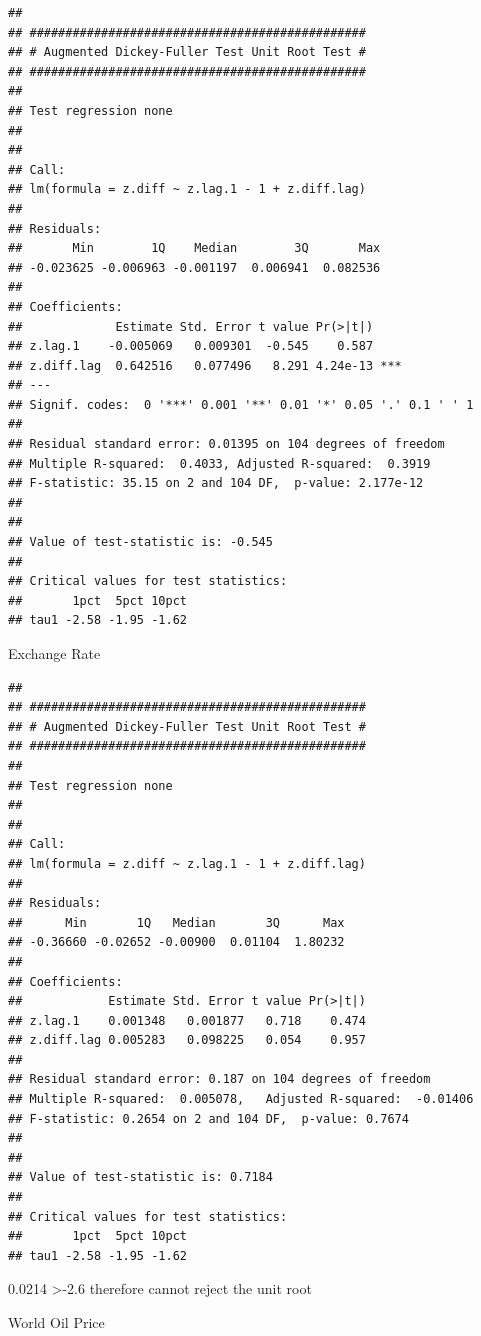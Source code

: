 \documentclass[11pt,preprint, authoryear]{elsarticle}
\numberwithin{equation}{section}
\numberwithin{figure}{section}
\numberwithin{table}{section}
\begin{document}
\begin{verbatim}
## 
## ############################################### 
## # Augmented Dickey-Fuller Test Unit Root Test # 
## ############################################### 
## 
## Test regression none 
## 
## 
## Call:
## lm(formula = z.diff ~ z.lag.1 - 1 + z.diff.lag)
## 
## Residuals:
##       Min        1Q    Median        3Q       Max 
## -0.023625 -0.006963 -0.001197  0.006941  0.082536 
## 
## Coefficients:
##             Estimate Std. Error t value Pr(>|t|)    
## z.lag.1    -0.005069   0.009301  -0.545    0.587    
## z.diff.lag  0.642516   0.077496   8.291 4.24e-13 ***
## ---
## Signif. codes:  0 '***' 0.001 '**' 0.01 '*' 0.05 '.' 0.1 ' ' 1
## 
## Residual standard error: 0.01395 on 104 degrees of freedom
## Multiple R-squared:  0.4033, Adjusted R-squared:  0.3919 
## F-statistic: 35.15 on 2 and 104 DF,  p-value: 2.177e-12
## 
## 
## Value of test-statistic is: -0.545 
## 
## Critical values for test statistics: 
##       1pct  5pct 10pct
## tau1 -2.58 -1.95 -1.62
\end{verbatim}

Exchange Rate

\begin{verbatim}
## 
## ############################################### 
## # Augmented Dickey-Fuller Test Unit Root Test # 
## ############################################### 
## 
## Test regression none 
## 
## 
## Call:
## lm(formula = z.diff ~ z.lag.1 - 1 + z.diff.lag)
## 
## Residuals:
##      Min       1Q   Median       3Q      Max 
## -0.36660 -0.02652 -0.00900  0.01104  1.80232 
## 
## Coefficients:
##            Estimate Std. Error t value Pr(>|t|)
## z.lag.1    0.001348   0.001877   0.718    0.474
## z.diff.lag 0.005283   0.098225   0.054    0.957
## 
## Residual standard error: 0.187 on 104 degrees of freedom
## Multiple R-squared:  0.005078,   Adjusted R-squared:  -0.01406 
## F-statistic: 0.2654 on 2 and 104 DF,  p-value: 0.7674
## 
## 
## Value of test-statistic is: 0.7184 
## 
## Critical values for test statistics: 
##       1pct  5pct 10pct
## tau1 -2.58 -1.95 -1.62
\end{verbatim}

0.0214 \textgreater-2.6 therefore cannot reject the unit root

World Oil Price
\end{document}
